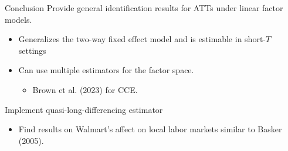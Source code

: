 \documentclass[aspectratio=169,t,11pt]{beamer}
\begin{document}
% 
% 
%   
%     
% 
% 


\begin{frame}{Conclusion}
  Provide general identification results for ATTs under linear factor models. 
  \begin{itemize}
      \item Generalizes the two-way fixed effect model and is estimable in short-$T$ settings

      \item Can use multiple estimators for the factor space. 
      \begin{itemize}
          \item Brown et al. (2023) for CCE.
      \end{itemize}
  \end{itemize}

  \bigskip
  Implement quasi-long-differencing estimator
  \begin{itemize}
      \item Find results on Walmart's affect on local labor markets similar to Basker (2005). 
  \end{itemize}
\end{frame}
\end{document}
